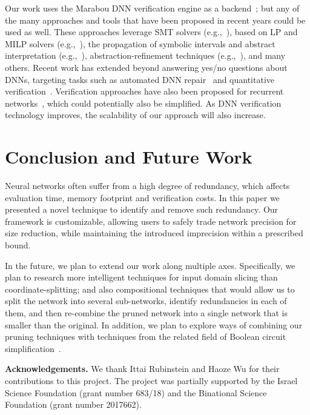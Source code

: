 \documentclass[10pt, conference, twocolumn, compsocconf]{IEEEtran}
\theoremstyle{remark}
\begin{document}
Our work uses the Marabou DNN verification engine as a
backend~\cite{Marabou2019,StWuZeJuKaBaKo20,KaBaDiJuKo17Fvav,CaKaBaDi17,
GoKaPaBa18,ElKaKaSc21,AmScKa21,KaBaKaSc19};
 but any of the many approaches and tools
that have been proposed in recent years could be used as well. These
approaches leverage SMT solvers (e.g.,~\cite{HuKwWaWu17}), based on LP
and MILP solvers (e.g.,~\cite{LoMa17,Eh17,TjXiTe17, BuTuToKoMu18}),
the propagation of symbolic intervals and abstract interpretation
(e.g.,~\cite{WaPeWhYaJa18, GeMiDrTsChVe18, WeZhChSoHsBoDhDa18,
  TrBkJo20}), abstraction-refinement techniques (e.g.,~\cite{ElGoKa20,
  AsHaKrMu20}), and many others. Recent work has extended beyond
answering yes/no questions about DNNs, targeting tasks such as
automated DNN repair~\cite{KoLoJaBl20,GoAdKeKa20} and quantitative
verification~\cite{BaShShiMeSa19}.  Verification approaches have also
been proposed for recurrent networks~\cite{ZhShGuGuLeNa20,JaBaKa20},
which could potentially also be simplified.  As DNN verification
technology improves, the scalability of our approach will also
increase.


\section{Conclusion and Future Work}
\label{sec:conclusion}
Neural networks often suffer from a high degree of redundancy, which
affects evaluation time, memory footprint and verification costs. In
this paper we presented a novel technique to identify and remove such
redundancy. Our framework is customizable, allowing users to safely
trade network precision for size reduction, while maintaining the
introduced imprecision within a prescribed bound.

In the future, we plan to extend our work along multiple
axes. Specifically, we plan to research more intelligent techniques
for input domain slicing than coordinate-splitting; and also
compositional techniques that would allow us to split the network into
several sub-networks, identify redundancies in each of them, and then
re-combine the pruned network into a single network that is smaller
than the original. In addition, we plan to explore ways of combining
our pruning techniques with techniques from the related field of 
Boolean circuit simplification~\cite{ChMaCh96}.

\medskip
\noindent
\textbf{Acknowledgements.} We thank Ittai Rubinstein and Haoze Wu for
their contributions to this project.  The project was partially
supported by the Israel Science Foundation (grant number 683/18) and
the Binational Science Foundation (grant number 2017662).
\end{document}
